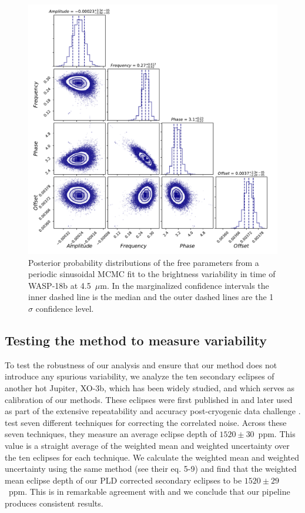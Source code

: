 \begin{figure}
    \centering
    \includegraphics[width=0.8\linewidth]{MCMCcorner.pdf}
    \caption{Posterior probability distributions of the free parameters from a periodic sinusoidal MCMC fit to the brightness variability in time of WASP-18b at 4.5~$\mu$m. In the marginalized confidence intervals the inner dashed line is the median and the outer dashed lines are the 1$\sigma$ confidence level. }
    \label{P3:fig:MCMCcorner}
\end{figure}

\subsection{Testing the method to measure variability}

To test the robustness of our analysis and ensure that our method does not introduce any spurious variability, we analyze the ten secondary eclipses of another hot Jupiter, XO-3b, which has been widely studied, and which serves as calibration of our methods. These eclipses were first published in \citet{Wong2014} and later used as part of the extensive repeatability and accuracy post-cryogenic \spitzerIRAC data challenge \citep{Ingalls2016}. \citet{Ingalls2016} test seven different techniques for correcting the correlated noise. Across these seven techniques, they measure an average eclipse depth of $1520 \pm 30$~ppm. This value is a straight average of the weighted mean and weighted uncertainty over the ten eclipses for each technique. We calculate the weighted mean and weighted uncertainty using the same method (see their eq. 5-9) and find that the weighted mean eclipse depth of our PLD corrected secondary eclipses to be $1520 \pm 29$~ppm. This is in remarkable agreement with \citet{Ingalls2016} and we conclude that our pipeline produces consistent results.

